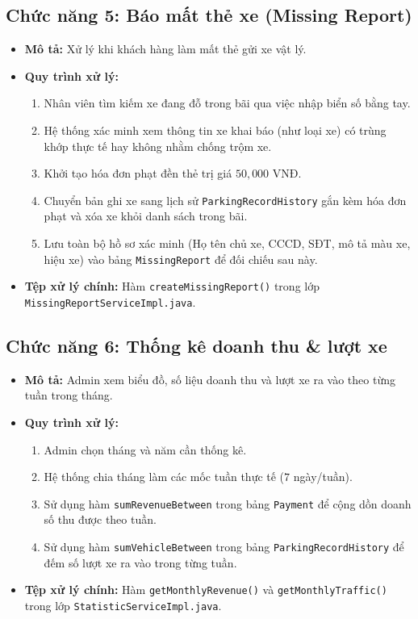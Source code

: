 \documentclass[12pt,a4paper]{article}
\begin{document}
\subsection{Chức năng 5: Báo mất thẻ xe (Missing Report)}
\begin{itemize}
    \item \textbf{Mô tả:} Xử lý khi khách hàng làm mất thẻ gửi xe vật lý.
    \item \textbf{Quy trình xử lý:}
    \begin{enumerate}
        \item Nhân viên tìm kiếm xe đang đỗ trong bãi qua việc nhập biển số bằng tay.
        \item Hệ thống xác minh xem thông tin xe khai báo (như loại xe) có trùng khớp thực tế hay không nhằm chống trộm xe.
        \item Khởi tạo hóa đơn phạt đền thẻ trị giá $50,000$ VNĐ.
        \item Chuyển bản ghi xe sang lịch sử \texttt{ParkingRecordHistory} gắn kèm hóa đơn phạt và xóa xe khỏi danh sách trong bãi.
        \item Lưu toàn bộ hồ sơ xác minh (Họ tên chủ xe, CCCD, SĐT, mô tả màu xe, hiệu xe) vào bảng \texttt{MissingReport} để đối chiếu sau này.
    \end{enumerate}
    \item \textbf{Tệp xử lý chính:} Hàm \texttt{createMissingReport()} trong lớp \texttt{MissingReportServiceImpl.java}.
\end{itemize}

\subsection{Chức năng 6: Thống kê doanh thu \& lượt xe}
\begin{itemize}
    \item \textbf{Mô tả:} Admin xem biểu đồ, số liệu doanh thu và lượt xe ra vào theo từng tuần trong tháng.
    \item \textbf{Quy trình xử lý:}
    \begin{enumerate}
        \item Admin chọn tháng và năm cần thống kê.
        \item Hệ thống chia tháng làm các mốc tuần thực tế ($7$ ngày/tuần).
        \item Sử dụng hàm \texttt{sumRevenueBetween} trong bảng \texttt{Payment} để cộng dồn doanh số thu được theo tuần.
        \item Sử dụng hàm \texttt{sumVehicleBetween} trong bảng \texttt{ParkingRecordHistory} để đếm số lượt xe ra vào trong từng tuần.
    \end{enumerate}
    \item \textbf{Tệp xử lý chính:} Hàm \texttt{getMonthlyRevenue()} và \texttt{getMonthlyTraffic()} trong lớp \texttt{StatisticServiceImpl.java}.
\end{itemize}
\end{document}
